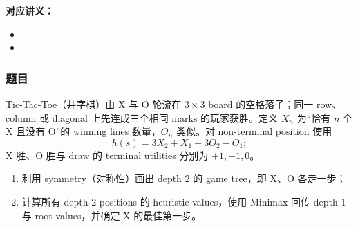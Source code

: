 
\textbf{对应讲义：}
\begin{itemize}
  \item {}
  \item {}
\end{itemize}

\subsubsection*{题目}

Tic-Tac-Toe（井字棋）由 X 与 O 轮流在 $3\times3$ board 的空格落子；同一 row、column 或 diagonal 上先连成三个相同 marks 的玩家获胜。定义 $X_n$ 为“恰有 $n$ 个 X 且没有 O”的 winning lines 数量，$O_n$ 类似。对 non-terminal position 使用
\[
  h(s)=3X_2+X_1-3O_2-O_1;
\]
X 胜、O 胜与 draw 的 terminal utilities 分别为 $+1,-1,0$。

\begin{enumerate}[label=(\alph*)]
  \item 利用 symmetry（对称性）画出 depth $2$ 的 game tree，即 X、O 各走一步；
  \item 计算所有 depth-2 positions 的 heuristic values，使用 Minimax 回传 depth $1$ 与 root values，并确定 X 的最佳第一步。
\end{enumerate}

